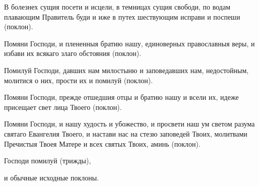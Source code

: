 В болезнех сущия посети и исцели, в темницах сущия свободи, по водам плавающим Правитель буди и иже в путех шествующим исправи и поспеши (поклон). 

Помяни Господи, и плененныя братию нашу, единоверных православныя веры, и избави их всякаго злаго обстояния (поклон). 

Помилуй Господи, давших нам милостыню и заповедавших нам, недостойным, молитися о них, прости их и помилуй (поклон). 

Помяни Господи, прежде отшедшия отцы и братию нашу и всели их, идеже присещает свет лица Твоего (поклон). 

Помяни Господи, и нашу худость и убожество, и просвети наш ум светом разума святаго Евангелия Твоего, и настави нас на стезю заповедей Твоих, молитвами Пречистыя Твоея Матере и всех святых Твоих, аминь (поклон). 

Господи помилуй (трижды),

и обычные исходные поклоны.
\mychapterending